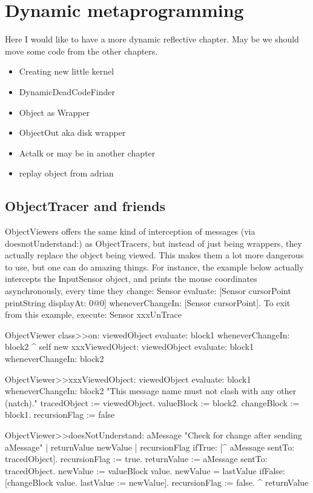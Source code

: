 \documentclass[a4paper,10pt,twoside]{book}
\begin{document}
	\sloppy
\fi
\chapter{Dynamic metaprogramming}

Here I would like to have a more dynamic reflective chapter.
May be we should move some code from the other chapters.

	
\begin{itemize}
\item Creating new little kernel


\item DynamicDeadCodeFinder 

\item Object as Wrapper

\item ObjectOut aka disk wrapper

\item Actalk or may be in another chapter

\item replay object from adrian
\end{itemize}


\section{ObjectTracer and friends}

ObjectViewers offers the same kind of interception of messages (via doesnotUnderstand:) as ObjectTracers, but instead of just being wrappers, they actually replace the object being viewed.  This makes them a lot more dangerous to use, but one can do amazing things.  For instance, the example below actually intercepts the InputSensor object, and prints the mouse coordinates asynchronously, every time they change:
	Sensor evaluate: [Sensor cursorPoint printString displayAt: 0@0]
		wheneverChangeIn: [Sensor cursorPoint].
To exit from this example, execute:
	Sensor xxxUnTrace

\begin{code}{}
ObjectViewer class>>on: viewedObject evaluate: block1 wheneverChangeIn: block2
	^ self new xxxViewedObject: viewedObject evaluate: block1 wheneverChangeIn: block2

ObjectViewer>>xxxViewedObject: viewedObject evaluate: block1 wheneverChangeIn: block2
	"This message name must not clash with any other (natch)."
	tracedObject := viewedObject.
	valueBlock := block2.
	changeBlock := block1.
	recursionFlag := false

ObjectViewer>>doesNotUnderstand: aMessage 
	"Check for change after sending aMessage"
	| returnValue newValue |
	recursionFlag ifTrue: [^ aMessage sentTo: tracedObject].
	recursionFlag := true.
	returnValue := aMessage sentTo: tracedObject.
	newValue := valueBlock value.
	newValue = lastValue ifFalse:
		[changeBlock value.
		lastValue := newValue].
	recursionFlag := false.
	^ returnValue
\end{code}
\end{document}
